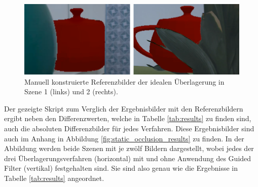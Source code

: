 \begin{figure}[h]
  \centering
	\includegraphics[width=1.0\textwidth]{content/images/evaluation/reference.png} 
  \caption{Manuell konstruierte Referenzbilder der idealen Überlagerung in Szene 1 (links) und 2 (rechts).}
  \label{fig:reference}
\end{figure}

Der gezeigte Skript zum Verglich der Ergebnisbilder mit den Referenzbildern ergibt neben den Differenzwerten, welche in Tabelle \ref{tab:results} zu finden sind, auch die absoluten Differenzbilder für jedes Verfahren. Diese Ergebnisbilder sind auch im Anhang in Abbildung \ref{fig:static_occlusion_results} zu finden. In der Abbildung werden beide Szenen mit je zwölf Bildern dargestellt, wobei jedes der drei Überlagerungsverfahren (horizontal) mit und ohne Anwendung des Guided Filter (vertikal) festgehalten sind. Sie sind also genau wie die Ergebnisse in Tabelle \ref{tab:results} angeordnet.\\


